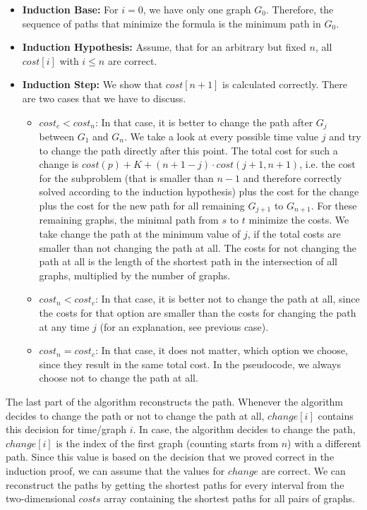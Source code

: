 \documentclass[12pt]{article}
\begin{document}
\begin{itemize}
	\item \textbf{Induction Base:} For $i=0$, we have only one graph $G_0$. Therefore, the sequence of paths that minimize the formula is the minimum path in $G_0$.
	\item \textbf{Induction Hypothesis:} Assume, that for an arbitrary but fixed $n$, all $\mathit{cost}[i]$ with $i \leq n$ are correct.
	\item \textbf{Induction Step:} We show that $\mathit{cost}[n+1]$ is calculated correctly. There are two cases that we have to discuss. \begin{itemize}
		\item $\mathit{cost}_c < \mathit{cost}_n$: In that case, it is better to change the path after $G_j$  between $G_1$ and $G_n$. We take a look at every possible time value $j$ and try to change the path directly after this point. The total cost for such a change is $\mathit{cost}(p) + K + (n+1-j) \cdot \mathit{cost}(j+1,n+1)$, i.e. the cost for the subproblem (that is smaller than $n-1$ and therefore correctly solved according to the induction hypothesis) plus the cost for the change plus the cost for the new path for all remaining $G_{j+1}$ to $G_{n+1}$. For these remaining graphs, the minimal path from $s$ to $t$ minimize the costs. We take change the path at the minimum value of $j$, if the total costs are smaller than not changing the path at all. The costs for not changing the path at all is the length of the shortest path in the intersection of all graphs, multiplied by the number of graphs.
	\item $\mathit{cost}_n < \mathit{cost}_c$: In that case, it is better not to change the path at all, since the costs for that option are smaller than the costs for changing the path at any time $j$ (for an explanation, see previous case).
	\item $\mathit{cost}_n = \mathit{cost}_c$: In that case, it does not matter, which option we choose, since they result in the same total cost. In the pseudocode, we always choose not to change the path at all. 
	\end{itemize}
\end{itemize}

The last part of the algorithm reconstructs the path. Whenever the algorithm decides to change the path or not to change the path at all, $\mathit{change}[i]$ contains this decision for time/graph $i$. In case, the algorithm decides to change the path, $\mathit{change}[i]$ is the index of the first graph (counting starts from $n$) with a different path. Since this value is based on the decision that we proved correct in the induction proof, we can assume that the values for $\mathit{change}$ are correct. We can reconstruct the paths by getting the shortest paths for every interval from the two-dimensional $\mathit{costs}$ array containing the shortest paths for all pairs of graphs.
\end{document}
